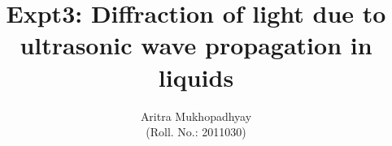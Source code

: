 \documentclass[12pt]{article}
\title{\textbf{Expt3: Diffraction of light due to\\ultrasonic wave propagation in liquids}}
\author{Aritra Mukhopadhyay\\(Roll. No.: 2011030)}
\begin{document}
	\maketitle
	
	
	
	
	
	


	
	
	\nocite{*}
\end{document}
